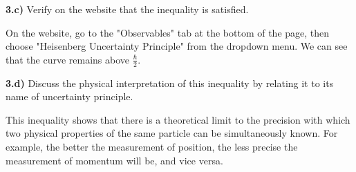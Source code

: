 \medskip

\noindent \textbf{3.c)} Verify on the website that the inequality is satisfied.\\

\begin{breakbox}
    \noindent On the website, go to the "Observables" tab at the bottom of the page, then choose "Heisenberg Uncertainty Principle" from the dropdown menu. We can see that the curve remains above $\displaystyle \frac{\hbar}{2}$.
\end{breakbox}

\medskip

\noindent \textbf{3.d)} Discuss the physical interpretation of this inequality by relating it to its name of uncertainty principle.\\

\begin{breakbox}
    \noindent This inequality shows that there is a theoretical limit to the precision with which two physical properties of the same particle can be simultaneously known. For example, the better the measurement of position, the less precise the measurement of momentum will be, and vice versa.    
\end{breakbox}